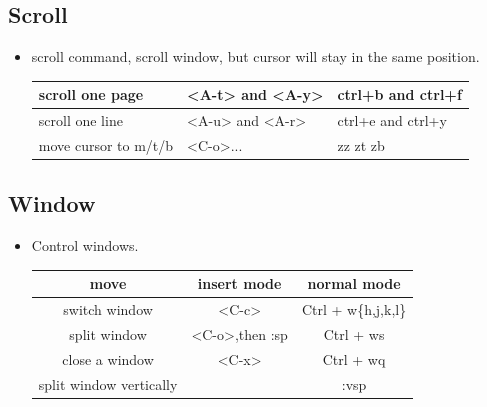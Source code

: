 \documentclass[a4paper,12pt,twoside]{book}
\begin{document}
\subsection{Scroll}
\begin{itemize}
\item scroll command, scroll window, but cursor will stay in the same position.
\begin{center}
 \begin{tabular}{p{}|p{}|p{}}
        \hline
        scroll one  page &  <A-t> and <A-y>  & ctrl+b and  ctrl+f    \\
        
        \hline 		  
        scroll one line &  <A-u> and <A-r>  & ctrl+e and ctrl+y \\
        
         \hline 		  
        move cursor to m/t/b & <C-o>...    & zz zt zb \\
		\hline
    \end{tabular}
\end{center}
\end{itemize} 

\subsection{Window}

\begin{itemize}
		\item Control windows.
\begin{center}
   \begin{tabular}{c|c|c}
   \hline
		move & insert mode & normal mode \\
		
\hline 
		switch window & <C-c> &  Ctrl + w\{h,j,k,l\}\\
				
		\hline 
		split window & <C-o>,then :sp  &  Ctrl + ws\\
		
		\hline 
		close a window & <C-x> & Ctrl + wq\\
		
		\hline
		split window vertically	&   & :vsp \\ 
\hline 
			\end{tabular}
	\end{center}
\end{itemize}
	
\end{document}
